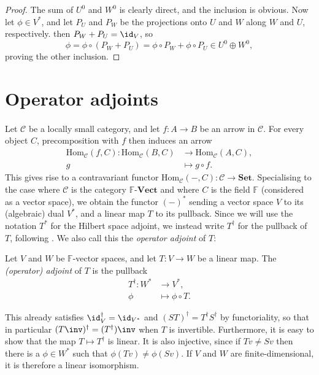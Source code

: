 \documentclass[a4paper, 11pt]{memoir}
\numberwithin{equation}{chapter}
\newcommand{\calC}{\mathcal{C}}
\newcommand{\field}{\mathbb{F}}
\newcommand{\newpar}{\paragraph{}}
\begin{document}
\begin{proof}
    The sum of $U^0$ and $W^0$ is clearly direct, and the inclusion \textquote{$\supseteq$} is obvious. Now let $\phi \in V^*$, and let $P_U$ and $P_W$ be the projections onto $U$ and $W$ along $W$ and $U$, respectively. then $P_W + P_U = \id_V$, so
    \begin{equation*}
        \phi
            = \phi \circ (P_W + P_U)
            = \phi \circ P_W + \phi \circ P_U
            \in U^0 \oplus W^0,
    \end{equation*}
    proving the other inclusion.
\end{proof}


\section{Operator adjoints}

\renewcommand{\hom}[1][]{\mathrm{Hom}_{#1}}

\newpar

Let $\calC$ be a locally small category, and let $f \colon A \to B$ be an arrow in $\calC$. For every object $C$, precomposition with $f$ then induces an arrow
%
\begin{align*}
    \hom[\calC](f,C) \colon \hom[\calC](B,C) &\to \hom[\calC](A,C), \\
        g &\mapsto g \circ f.
\end{align*}
%
This gives rise to a contravariant functor $\hom[\calC](-,C) \colon \calC \to \mathbf{Set}$. Specialising to the case where $\calC$ is the category $\field\text{-}\mathbf{Vect}$ and where $C$ is the field $\field$ (considered as a vector space), we obtain the functor $(-)^*$ sending a vector space $V$ to its (algebraic) dual $V^*$, and a linear map $T$ to its pullback. Since we will use the notation $T^*$ for the Hilbert space adjoint, we instead write $T^\dagger$ for the pullback of $T$, following \textcite{follandrealanalysis}. We also call this the \emph{operator adjoint} of $T$:

\begin{definition}
    Let $V$ and $W$ be $\field$-vector spaces, and let $T \colon V \to W$ be a linear map. The \emph{(operator) adjoint} of $T$ is the pullback
    \begin{align*}
        T^\dagger \colon W^* &\to V^*, \\
        \phi &\mapsto \phi \circ T.
    \end{align*}
\end{definition}
%
This already satisfies $\id_V^\dagger = \id_{V^*}$ and $(ST)^\dagger = T^\dagger S^\dagger$ by functoriality, so that in particular $(T\inv)^\dagger = (T^\dagger)\inv$ when $T$ is invertible. Furthermore, it is easy to show that the map $T \mapsto T^\dagger$ is linear. It is also injective, since if $Tv \neq Sv$ then there is a $\phi \in W^*$ such that $\phi(Tv) \neq \phi(Sv)$. If $V$ and $W$ are finite-dimensional, it is therefore a linear isomorphism.
\end{document}
